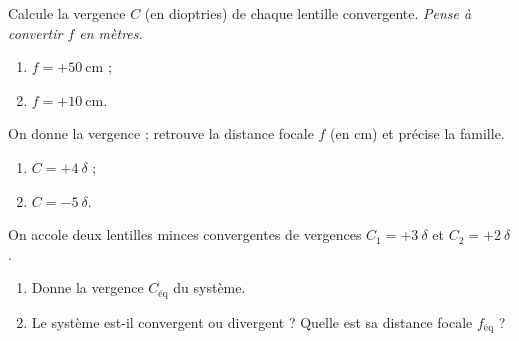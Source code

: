 \documentclass[11pt,a4paper]{article}
\begin{document}
\begin{exo}
Calcule la vergence $C$ (en dioptries) de chaque lentille convergente. \emph{Pense à convertir $f$ en
mètres.}
\begin{enumerate}[label=\alph*)]
  \item $f=+\qty{50}{\cm}$ ;
  \item $f=+\qty{10}{\cm}$.
\end{enumerate}
\end{exo}

\begin{exo}
On donne la vergence ; retrouve la distance focale $f$ (en cm) et précise la famille.
\begin{enumerate}[label=\alph*)]
  \item $C=+4~\delta$ ;
  \item $C=-5~\delta$.
\end{enumerate}
\end{exo}

\begin{exo}
On accole deux lentilles minces convergentes de vergences $C_1=+3~\delta$ et $C_2=+2~\delta$.
\begin{enumerate}[label=\alph*)]
  \item Donne la vergence $C_{\text{éq}}$ du système.
  \item Le système est-il convergent ou divergent ? Quelle est sa distance focale $f_{\text{éq}}$ ?
\end{enumerate}
\end{exo}
\end{document}
